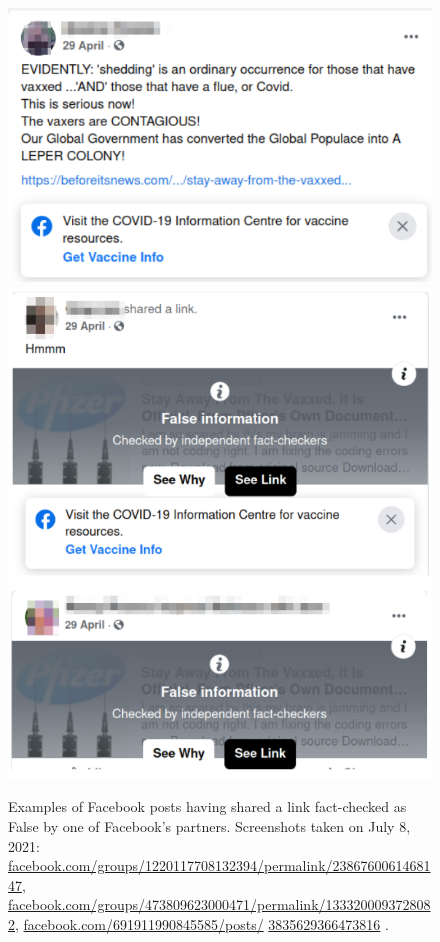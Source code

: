\documentclass{article}
\begin{document}
\begin{figure}[h]
\centering
\includegraphics[scale=0.35]{./img/fb_flags/fb_flag_1.png}
\includegraphics[scale=0.35]{./img/fb_flags/fb_flag_2.png}
\includegraphics[scale=0.49]{./img/fb_flags/fb_flag_3.png}
\caption{Examples of Facebook posts having shared a link fact-checked as False by one of Facebook’s partners. Screenshots taken on July 8, 2021: \href{https://www.facebook.com/groups/1220117708132394/permalink/2386760061468147}{facebook.com/groups/1220117708132394/permalink/2386760061468147},  \href{https://www.facebook.com/groups/473809623000471/permalink/1333200093728082}{facebook.com/groups/473809623000471/permalink/1333200093728082}, \href{https://www.facebook.com/691911990845585/posts/3835629366473816}{facebook.com/691911990845585/posts/} \href{https://www.facebook.com/691911990845585/posts/3835629366473816}{3835629366473816} .} 
\label{fb_flags}
\end{figure}
\end{document}
